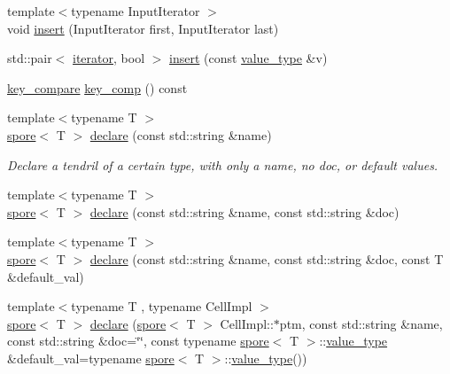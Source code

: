 \begin{DoxyCompactItemize}
\item 
{\footnotesize template$<$typename Input\+Iterator $>$ }\\void \hyperlink{classecto_1_1tendrils_ac8926dfa72716d030751e09f6461fa6c}{insert} (Input\+Iterator first, Input\+Iterator last)
\item 
std\+::pair$<$ \hyperlink{classecto_1_1tendrils_a6f0b7bd6e3a03f047351303630b889e0}{iterator}, bool $>$ \hyperlink{classecto_1_1tendrils_a98adbbe057fc34545cd51c7deeafca2f}{insert} (const \hyperlink{classecto_1_1tendrils_a736870868e76890e198448924cecdd4f}{value\+\_\+type} \&v)
\item 
\hyperlink{classecto_1_1tendrils_aa347bebda44153437e8554a25bed9e6b}{key\+\_\+compare} \hyperlink{classecto_1_1tendrils_ab56662cb08014858ce9df9403a357954}{key\+\_\+comp} () const 
\item 
{\footnotesize template$<$typename T $>$ }\\\hyperlink{structecto_1_1spore}{spore}$<$ T $>$ \hyperlink{classecto_1_1tendrils_aebef8c562cb501738d2a7f8fa5e53518}{declare} (const std\+::string \&name)
\begin{DoxyCompactList}\small\item\em Declare a tendril of a certain type, with only a name, no doc, or default values. \end{DoxyCompactList}\item 
{\footnotesize template$<$typename T $>$ }\\\hyperlink{structecto_1_1spore}{spore}$<$ T $>$ \hyperlink{classecto_1_1tendrils_a58b219396a7e5ca2f2876efc2f66aa38}{declare} (const std\+::string \&name, const std\+::string \&doc)
\item 
{\footnotesize template$<$typename T $>$ }\\\hyperlink{structecto_1_1spore}{spore}$<$ T $>$ \hyperlink{classecto_1_1tendrils_a89e7ed34481d3ed987ddfd5ba35174ae}{declare} (const std\+::string \&name, const std\+::string \&doc, const T \&default\+\_\+val)
\item 
{\footnotesize template$<$typename T , typename Cell\+Impl $>$ }\\\hyperlink{structecto_1_1spore}{spore}$<$ T $>$ \hyperlink{classecto_1_1tendrils_a65a2a2745bd52ccc827c63d4cc016224}{declare} (\hyperlink{structecto_1_1spore}{spore}$<$ T $>$ Cell\+Impl\+::$\ast$ptm, const std\+::string \&name, const std\+::string \&doc=\char`\"{}\char`\"{}, const typename \hyperlink{structecto_1_1spore}{spore}$<$ T $>$\+::\hyperlink{classecto_1_1tendrils_a736870868e76890e198448924cecdd4f}{value\+\_\+type} \&default\+\_\+val=typename \hyperlink{structecto_1_1spore}{spore}$<$ T $>$\+::\hyperlink{classecto_1_1tendrils_a736870868e76890e198448924cecdd4f}{value\+\_\+type}())

\end{DoxyCompactItemize}

